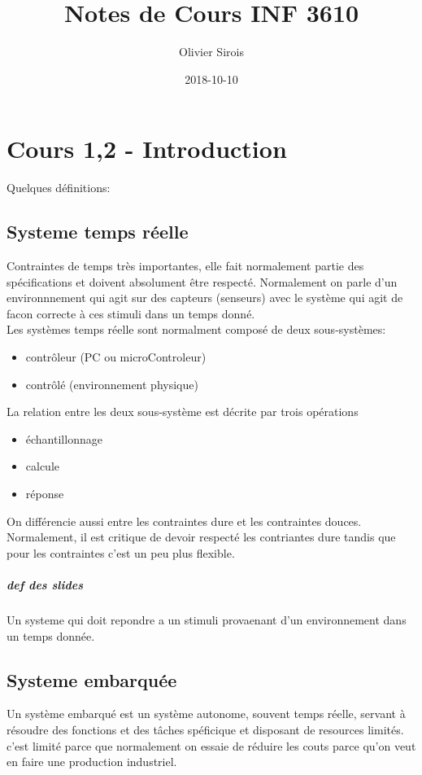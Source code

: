 \documentclass[oneside]{book}
\title{Notes de Cours INF 3610}
\date{2018-10-10}
\author{Olivier Sirois}
\begin{document}
    \setcounter{page}{1}
    \maketitle
    \tableofcontents
    \chapter{Cours 1,2 - Introduction}
    Quelques définitions:\\
    
    \section{Systeme temps réelle}
    Contraintes de temps très importantes, elle fait normalement partie des spécifications et doivent absolument être respecté. Normalement on parle d'un environnnement qui agit sur des capteurs (senseurs) avec le système qui agit de facon correcte à ces stimuli dans un temps donné.\\
    
    Les systèmes temps réelle sont normalment composé de deux sous-systèmes:
    \begin{itemize}
        \item contrôleur (PC ou microControleur)
        \item contrôlé (environnement physique)
    \end{itemize}

    La relation entre les deux sous-système est décrite par trois opérations
    \begin{itemize}
        \item échantillonnage
        \item calcule
        \item réponse
    \end{itemize}

    On différencie aussi entre les contraintes dure et les contraintes douces. Normalement, il est critique de devoir respecté les contriantes dure tandis que pour les contraintes c'est un peu plus flexible.
    \paragraph{def des slides}
    Un systeme qui doit repondre a un stimuli provaenant d'un environnement dans un temps donnée.\\
    
    \section{Systeme embarquée}
    Un système embarqué est un système autonome, souvent temps réelle, servant à résoudre des fonctions et des tâches spéficique et disposant de resources limités. c'est limité parce que normalement on essaie de réduire les couts parce qu'on veut en faire une production industriel.\\
    
\end{document}
